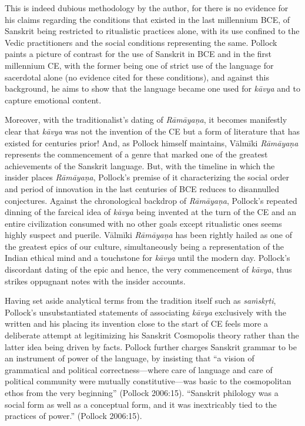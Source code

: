 This is indeed dubious methodology by the author, for there is no evidence for his claims regarding the conditions that existed in the last millennium BCE, of Sanskrit being restricted to ritualistic practices alone, with its use confined to the Vedic practitioners and the social conditions representing the same. Pollock paints a picture of contrast for the use of Sanskrit in BCE and in the first millennium CE, with the former being one of strict use of the language for sacerdotal alone (no evidence cited for these conditions), and against this background, he aims to show that the language became one used for \textit{kāvya} and to capture emotional content.

Moreover, with the traditionalist’s dating of \textit{Rāmāyaṇa}, it becomes manifestly clear that \textit{kāvya} was not the invention of the CE but a form of literature that has existed for centuries prior! And, as Pollock himself maintains, Vālmīki \textit{Rāmāyaṇa} represents the commencement of a genre that marked one of the greatest achievements of the Sanskrit language. But, with the timeline in which the insider places \textit{Rāmāyaṇa}, Pollock’s premise of it characterizing the social order and period of innovation in the last centuries of BCE reduces to disannulled conjectures. Against the chronological backdrop of \textit{Rāmāyaṇa}, Pollock’s repeated dinning of the farcical idea of \textit{kāvya} being invented at the turn of the CE and an entire civilization consumed with no other goals except ritualistic ones seems highly suspect and puerile. Vālmīki \textit{Rāmāyaṇa} has been rightly hailed as one of the greatest epics of our culture, simultaneously being a representation of the Indian ethical mind and a touchstone for \textit{kāvya} until the modern day. Pollock’s discordant dating of the epic and hence, the very commencement of \textit{kāvya}, thus strikes oppugnant notes with the insider accounts.

Having set aside analytical terms from the tradition itself such as \textit{saṁskṛti}, Pollock’s unsubstantiated statements of associating \textit{kāvya} exclusively with the written and his placing its invention close to the start of CE feels more a deliberate attempt at legitimizing his Sanskrit Cosmopolis theory rather than the latter idea being driven by facts. Pollock further charges Sanskrit grammar to be an instrument of power of the language, by insisting that “a vision of grammatical and political correctness—where care of language and care of political community were mutually constitutive—was basic to the cosmopolitan ethos from the very beginning” (Pollock 2006:15). “Sanskrit philology was a social form as well as a conceptual form, and it was inextricably tied to the practices of power.” (Pollock 2006:15).

